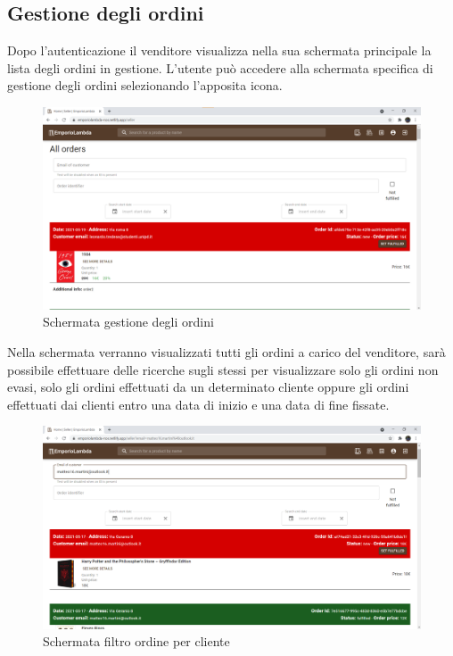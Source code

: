 \subsection{Gestione degli ordini}\label{OrdiniVenditore}
Dopo l'autenticazione il venditore visualizza nella sua schermata principale la lista degli ordini in gestione. L'utente può accedere alla schermata specifica di gestione degli ordini selezionando l'apposita icona. 
\begin{figure}[H]
	\centering
	\includegraphics[scale=0.4]{Immagini/Venditore/Orders.png}
	\caption{Schermata gestione degli ordini}
	\label{fig:OrdiniVend}
\end{figure}
\newpage
Nella schermata verranno visualizzati tutti gli ordini a carico del venditore, sarà possibile effettuare delle ricerche sugli stessi per visualizzare solo gli ordini non evasi, solo gli ordini effettuati da un determinato cliente oppure gli ordini effettuati dai clienti entro una data di inizio e una data di fine fissate.
\begin{figure}[H]
	\centering
	\includegraphics[scale=0.4]{Immagini/Venditore/Orders Customer Filter.png}
	\caption{Schermata filtro ordine per cliente}
	\label{fig:OrdiniCliente}
\end{figure}
